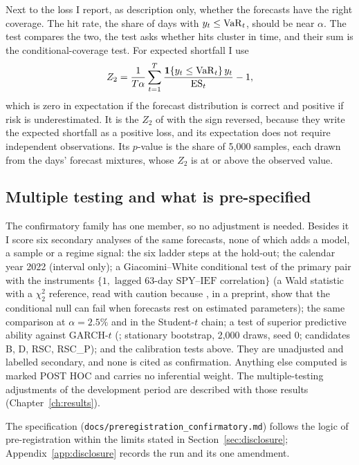 Next to the loss I report, as description only, whether the forecasts have the right coverage. The hit rate, the share of days with $y_t\le\mathrm{VaR}_t$, should be near $\alpha$. The \citet{kupiec1995} test compares the two, the \citet{christoffersen1998} test asks whether hits cluster in time, and their sum is the conditional-coverage test. For expected shortfall I use
\begin{equation}
Z_2=\frac{1}{T\alpha}\sum_{t=1}^{T}\frac{\mathbf{1}\{y_t\le\mathrm{VaR}_t\}\,y_t}{\mathrm{ES}_t}-1,
\end{equation}
which is zero in expectation if the forecast distribution is correct and positive if risk is underestimated. It is the $Z_2$ of \citet{acerbi2014} with the sign reversed, because they write the expected shortfall as a positive loss, and its expectation does not require independent observations. Its $p$-value is the share of 5,000 samples, each drawn from the days' forecast mixtures, whose $Z_2$ is at or above the observed value.

\subsection{Multiple testing and what is pre-specified}\label{sec:prereg}

The confirmatory family has one member, so no adjustment is needed. Besides it I score six secondary analyses of the same forecasts, none of which adds a model, a sample or a regime signal: the six ladder steps at the hold-out; the calendar year 2022 (interval only); a Giacomini--White conditional test of the primary pair with the instruments $\{1,\text{ lagged 63-day SPY--IEF correlation}\}$ (a Wald statistic with a $\chi^2_2$ reference, read with caution because \citet{zhu2020}, in a preprint, show that the conditional null can fail when forecasts rest on estimated parameters); the same comparison at $\alpha=2.5\%$ and in the Student-$t$ chain; a test of superior predictive ability against GARCH-$t$ (\citealp{hansen2005}; stationary bootstrap, 2,000 draws, seed 0; candidates B, D, RSC, RSC\_P); and the calibration tests above. They are unadjusted and labelled secondary, and none is cited as confirmation. Anything else computed is marked POST HOC and carries no inferential weight. The multiple-testing adjustments of the development period \citep{holm1979} are described with those results (Chapter~\ref{ch:results}).

The specification (\texttt{docs/preregistration\_confirmatory.md}) follows the logic of pre-registration \citep{nosek2018} within the limits stated in Section~\ref{sec:disclosure}; Appendix~\ref{app:disclosure} records the run and its one amendment.
